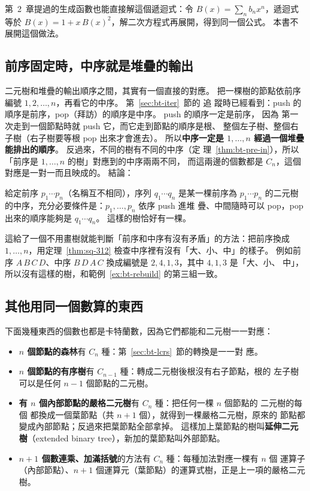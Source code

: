 第~2~章提過的生成函數也能直接解這個遞迴式：令 $B(x) = \sum_n b_n x^n$，遞迴式等於
$B(x) = 1 + x\,B(x)^2$，解二次方程式再展開，得到同一個公式。 本書不展開這個做法。

\subsection{前序固定時，中序就是堆疊的輸出}

二元樹和堆疊的輸出順序之間，其實有一個直接的對應。 把一棵樹的節點依前序編號
$1, 2, \ldots, n$，再看它的中序。 第~\ref{sec:bt-iter}~節的  追
蹤時已經看到：push 的順序是前序，pop（拜訪）的順序是中序。 push 的順序一定是前序，
因為  第一次走到一個節點時就 push 它，而它走到節點的順序是根、
整個左子樹、整個右子樹（右子樹要等根 pop 出來才會進去）。 所以\textbf{中序一定是
$1, \ldots, n$ 經過一個堆疊能排出的順序}。 反過來，不同的樹有不同的中序（定
理~\ref{thm:bt-pre-in}），所以「前序是 $1, \ldots, n$ 的樹」對應到的中序兩兩不同，
而這兩邊的個數都是 $C_n$，這個對應是一對一而且映成的。 結論：

\begin{theorem}
\label{thm:bt-pre-stack}
給定前序 $p_1 \cdots p_n$（名稱互不相同），序列 $q_1 \cdots q_n$ 是某一棵前序為
$p_1 \cdots p_n$ 的二元樹的中序，充分必要條件是：$p_1, \ldots, p_n$ 依序 push 進堆
疊、中間隨時可以 pop，pop 出來的順序能夠是 $q_1 \cdots q_n$。 這樣的樹恰好有一棵。
\end{theorem}

這給了一個不用畫樹就能判斷「前序和中序有沒有矛盾」的方法：把前序換成 $1, \ldots,
n$，用定理~\ref{thm:sq-312} 檢查中序裡有沒有「大、小、中」的樣子。 例如前序
$A\,B\,C\,D$、中序 $B\,D\,A\,C$ 換成編號是 $2, 4, 1, 3$，其中 $4, 1, 3$ 是「大、小、
中」，所以沒有這樣的樹，和範例~\ref{ex:bt-rebuild} 的第三組一致。

\subsection{其他用同一個數算的東西}

下面幾種東西的個數也都是卡特蘭數，因為它們都能和二元樹一一對應：

\begin{itemize}
\item \textbf{$n$ 個節點的森林}有 $C_n$ 種：第~\ref{sec:bt-lcrs}~節的轉換是一一對
應。
\item \textbf{$n$ 個節點的有序樹}有 $C_{n-1}$ 種：轉成二元樹後根沒有右子節點，根的
左子樹可以是任何 $n - 1$ 個節點的二元樹。
\item \textbf{有 $n$ 個內部節點的嚴格二元樹}有 $C_n$ 種：把任何一棵 $n$ 個節點的
二元樹的每個 \NIL 都換成一個葉節點（共 $n + 1$ 個），就得到一棵嚴格二元樹，原來的
節點都變成內部節點；反過來把葉節點全部拿掉。 這樣加上葉節點的樹叫\textbf{延伸二元
樹}（extended binary tree），新加的葉節點叫外部節點。
\item \textbf{$n + 1$ 個數連乘、加滿括號}的方法有 $C_n$ 種：每種加法對應一棵有 $n$ 個
運算子（內部節點）、$n + 1$ 個運算元（葉節點）的運算式樹，正是上一項的嚴格二元樹。
\end{itemize}

